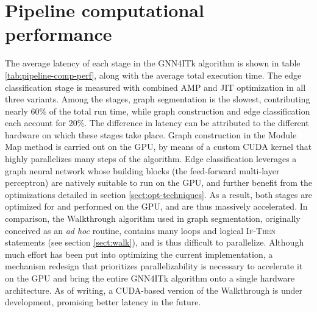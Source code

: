 

\section{Pipeline computational performance}
\label{sect:pipeline-comp-perf}
The average latency of each stage in the GNN4ITk algorithm is shown in table \ref{tab:pipeline-comp-perf}, along with the average total execution time. 
The edge classification stage is measured with combined AMP and JIT optimization in all three variants.
Among the stages, graph segmentation is the slowest, contributing nearly 60\% of the total run time, while graph construction and edge classification each account for 20\%.
The difference in latency can be attributed to the different hardware on which these stages take place.
Graph construction in the Module Map method is carried out on the GPU, by means of a custom CUDA kernel that highly parallelizes many steps of the algorithm.
Edge classification leverages a graph neural network whose building blocks (the feed-forward multi-layer perceptron) are natively suitable to run on the GPU, and further benefit from the optimizations detailed in section \ref{sect:opt-techniques}.
As a result, both stages are optimized for and performed on the GPU, and are thus massively accelerated.
In comparison, the Walkthrough algorithm used in graph segmentation, originally conceived as an \textit{ad hoc} routine, contains many loops and logical \textsc{If-Then} statements (see section \ref{sect:walk}), and is thus difficult to parallelize.  
Although much effort has been put into optimizing the current implementation, a mechanism redesign that prioritizes parallelizability is necessary to accelerate it on the GPU and bring the entire GNN4ITk algorithm onto a single hardware architecture.
As of writing, a CUDA-based version of the Walkthrough is under development, promising better latency in the future. 

